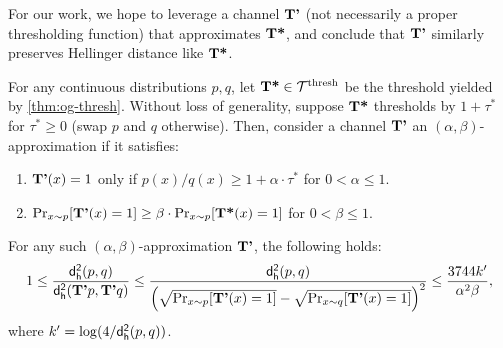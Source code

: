 For our work, we hope to leverage a channel $\textbf{T'}$ (not necessarily a proper thresholding function) that approximates $\textbf{T*}$, and conclude that $\textbf{T'}$ similarly preserves Hellinger distance like $\textbf{T*}$. 

\begin{theorem}\label{thm:mod-thresh}
    For any continuous distributions $p,q$, let $\textbf{T*} \in \mathcal{T}^{\operatorname{thresh}}$ be the threshold yielded by \cref{thm:og-thresh}. Without loss of generality, suppose $\textbf{T*}$ thresholds by $1 + \tau^*$ for $\tau^* \ge 0$ (swap $p$ and $q$ otherwise). Then, consider a channel $\textbf{T'}$ an $(\alpha,\beta)$-approximation if it satisfies:
    \begin{enumerate}
        \item $\textbf{T'}(x) = 1$ only if $p(x)/q(x) \ge 1 + \alpha \cdot \tau^*$ for $0 < \alpha \le 1$.
        \item $\operatorname{{Pr}}_{x \sim p}[\textbf{T'}(x) = 1] \ge \beta \cdot \operatorname{{Pr}}_{x \sim p}[\textbf{T*}(x) = 1]$ for $0 < \beta \le 1$.
    \end{enumerate}
    For any such $(\alpha,\beta)$-approximation $\textbf{T'}$, the following holds:
    \begin{equation}
        1 \le \frac{\mathsf{d_{h}^2}(p,q)}{\mathsf{d_{h}^2}(\textbf{T'} p, \textbf{T'} q)}  \le \frac{\mathsf{d_{h}^2}(p,q)}{\left(\sqrt{\operatorname{{Pr}}_{x \sim p}[\textbf{T'}(x)=1]} - \sqrt{\operatorname{{Pr}}_{x \sim q}[\textbf{T'}(x)=1]} \right)^2} \le \frac{3744 k'}{\alpha^2 \beta},
    \end{equation}
    where $k' = \log(4/\mathsf{d_{h}^2}(p,q))$.
\end{theorem}
